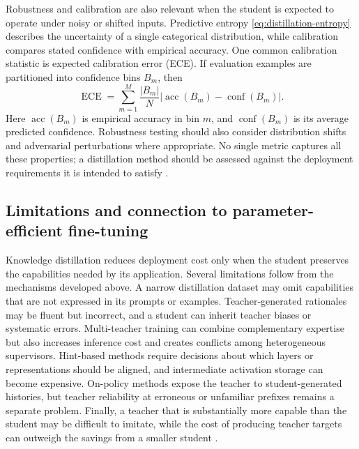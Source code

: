 Robustness and calibration are also relevant when the student is expected
to operate under noisy or shifted inputs.  Predictive entropy
\cref{eq:distillation-entropy} describes the uncertainty of a single
categorical distribution, while calibration compares stated confidence
with empirical accuracy.  One common calibration statistic is expected
calibration error (ECE).  If evaluation examples are partitioned into
confidence bins \(B_m\), then
\begin{equation}
    \operatorname{ECE}
    =\sum_{m=1}^{M}
    \frac{|B_m|}{N}
    \left|
      \operatorname{acc}(B_m)
      -\operatorname{conf}(B_m)
    \right|.
    \label{eq:distillation-ece}
\end{equation}
Here \(\operatorname{acc}(B_m)\) is empirical accuracy in bin \(m\),
and \(\operatorname{conf}(B_m)\) is its average predicted confidence.
Robustness testing should also consider distribution shifts and adversarial
perturbations where appropriate.  No single metric captures all these
properties; a distillation method should be assessed against the deployment
requirements it is intended to satisfy
\parencite{Yang2024SurveyKD,Fang2026KnowledgeDatasetDistillation}.

\subsection{Limitations and connection to parameter-efficient fine-tuning}
\label{subsec:distillation-limitations-next-topic}

Knowledge distillation reduces deployment cost only when the student
preserves the capabilities needed by its application.  Several limitations
follow from the mechanisms developed above.  A narrow distillation dataset
may omit capabilities that are not expressed in its prompts or examples.
Teacher-generated rationales may be fluent but incorrect, and a student can
inherit teacher biases or systematic errors.  Multi-teacher training can
combine complementary expertise but also increases inference cost and
creates conflicts among heterogeneous supervisors.  Hint-based methods
require decisions about which layers or representations should be aligned,
and intermediate activation storage can become expensive.  On-policy
methods expose the teacher to student-generated histories, but teacher
reliability at erroneous or unfamiliar prefixes remains a separate problem.
Finally, a teacher that is substantially more capable than the student may
be difficult to imitate, while the cost of producing teacher targets can
outweigh the savings from a smaller student
\parencite{Yang2024SurveyKD,Peng2024PretrainingDistillation,Busbridge2025DistillationScalingLaws,Song2026OnPolicyDistillation}.

